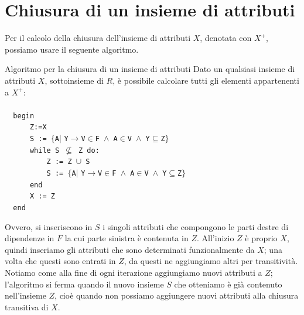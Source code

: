 \section{Chiusura di un insieme di attributi}
Per il calcolo della chiusura dell'insieme di attributi $X$, denotata con $X^+$, possiamo usare il seguente algoritmo.

\begin{Algoritmo}{Algoritmo per la chiusura di un insieme di attributi}{}\label{algo:chiusura-insieme-attributi}
Dato un qualsiasi insieme di attributi $X$, sottoinsieme di $R$, è possibile calcolare tutti gli elementi appartenenti a $X^+$:\\\\
\verb|  begin|\\
\verb|      Z:=X|\\
\verb|      S := |$\{$\verb|A|$|$ \verb|Y|$\to$\verb|V|$\in$\verb|F |$\land$\verb| A|$\in$\verb|V |$\land$\verb| Y|$\subseteq$\verb|Z|$\}$\\
\verb|      while S |$\not\subseteq$\verb| Z do:|\\
\verb|          Z := Z |$\cup$\verb| S|\\
\verb|          S := |$\{$\verb|A|$|$ \verb|Y|$\to$\verb|V|$\in$\verb|F |$\land$\verb| A|$\in$\verb|V |$\land$\verb| Y|$\subseteq$\verb|Z|$\}$\\
\verb|      end|\\
\verb|      X := Z|\\
\verb|  end|

Ovvero, si inseriscono in $S$ i singoli attributi che compongono le parti destre di dipendenze in $F$ la cui parte sinistra è contenuta in $Z$. All'inizio $Z$ è proprio $X$, quindi inseriamo gli attributi che sono determinati funzionalmente da $X$; una volta che questi sono entrati in $Z$, da questi ne aggiungiamo altri per transitività. Notiamo come alla fine di ogni iterazione aggiungiamo nuovi attributi a $Z$; l'algoritmo si ferma quando il nuovo insieme $S$ che otteniamo è già contenuto nell'insieme $Z$, cioè quando non possiamo aggiungere nuovi attributi alla chiusura transitiva di $X$.
\end{Algoritmo}

